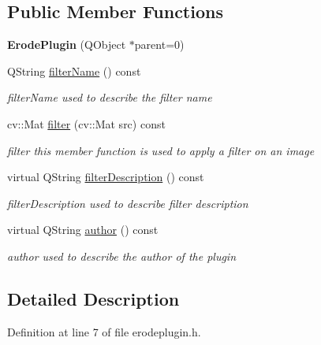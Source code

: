 \subsection*{Public Member Functions}
\begin{DoxyCompactItemize}
\item 
\mbox{\label{class_morpho_logical_1_1_erode_plugin_a9e6b5766716c2ab5abc6a3353f103ae4}} 
{\bfseries Erode\+Plugin} (Q\+Object $\ast$parent=0)
\item 
Q\+String \hyperlink{class_morpho_logical_1_1_erode_plugin_a7c3de038d5f2451861c021158c942aab}{filter\+Name} () const
\begin{DoxyCompactList}\small\item\em filter\+Name used to describe the filter name \end{DoxyCompactList}\item 
cv\+::\+Mat \hyperlink{class_morpho_logical_1_1_erode_plugin_adaf5cef6022e87b1facd95063c92a2dc}{filter} (cv\+::\+Mat src) const
\begin{DoxyCompactList}\small\item\em filter this member function is used to apply a filter on an image \end{DoxyCompactList}\item 
virtual Q\+String \hyperlink{class_morpho_logical_1_1_erode_plugin_a11da98b723970e68dae002337ac36875}{filter\+Description} () const
\begin{DoxyCompactList}\small\item\em filter\+Description used to describe filter description \end{DoxyCompactList}\item 
virtual Q\+String \hyperlink{class_morpho_logical_1_1_erode_plugin_a5cd6e9ed96ec99a9586952e70f2a43b5}{author} () const
\begin{DoxyCompactList}\small\item\em author used to describe the author of the plugin \end{DoxyCompactList}\end{DoxyCompactItemize}


\subsection{Detailed Description}


Definition at line 7 of file erodeplugin.\+h.



